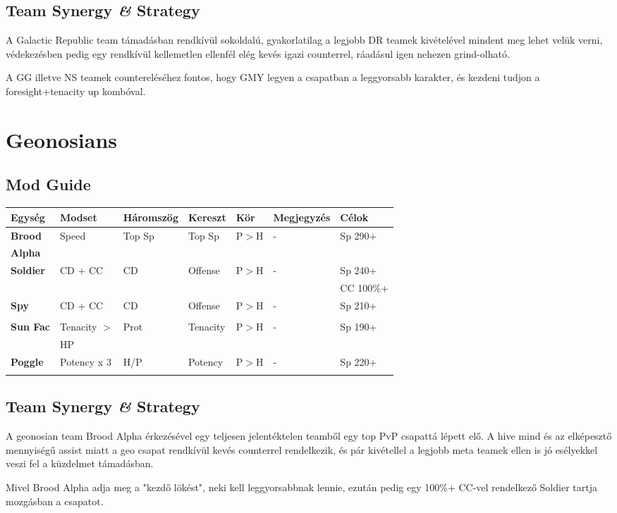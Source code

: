 \documentclass[11pt]{report}
\begin{document}
\section{Team Synergy \textit{\&} Strategy}
A Galactic Republic team támadásban rendkívül sokoldalú, gyakorlatilag a legjobb DR teamek kivételével mindent meg lehet velük verni, védekezésben pedig egy rendkívül kellemetlen ellenfél elég kevés igazi counterrel, ráadásul igen nehezen grind-olható.\par
A GG illetve NS teamek countereléséhez fontos, hogy GMY legyen a csapatban a leggyorsabb karakter, és kezdeni tudjon a foresight+tenacity up kombóval.


\chapter{Geonosians}
\section{Mod Guide}
\begin{center}
    \begin{tabular}{|l | l | l | l | l | l | l |}
        \hline
        Egység & Modset & Háromszög & Kereszt & Kör & Megjegyzés & Célok\\ \hline
        \textbf{Brood} & Speed & Top Sp & Top Sp & P$>$H & - & Sp 290+\\
        \textbf{Alpha} &  &  &  &  &  & \\ \hline
        \textbf{Soldier} & CD + CC & CD & Offense & P$>$H & - & Sp 240+\\
        &  &  &  &  &  & CC 100\%+\\ \hline
        \textbf{Spy} & CD + CC & CD & Offense & P$>$H & - & Sp 210+\\
        &  &  &  &  &  & \\ \hline
        \textbf{Sun Fac} & Tenacity $>$ & Prot & Tenacity & P$>$H & - & Sp 190+\\
        & HP &  &  &  &  & \\ \hline
        \textbf{Poggle} & Potency x 3 & H/P & Potency & P$>$H & - & Sp 220+\\
        &  &  &  &  &  & \\ \hline
    \end{tabular}
\end{center}
\section{Team Synergy \textit{\&} Strategy}
A geonosian team Brood Alpha érkezésével egy teljesen jelentéktelen teamből egy top PvP csapattá lépett elő. A hive mind és az elképesztő mennyiségű assist miatt a geo csapat rendkívül kevés counterrel rendelkezik, és pár kivétellel a legjobb meta teamek ellen is jó esélyekkel veszi fel a küzdelmet támadásban.\par
Mivel Brood Alpha adja meg a "kezdő lökést", neki kell leggyorsabbnak lennie, ezután pedig egy 100\%+ CC-vel rendelkező Soldier tartja mozgásban a csapatot.
\end{document}
